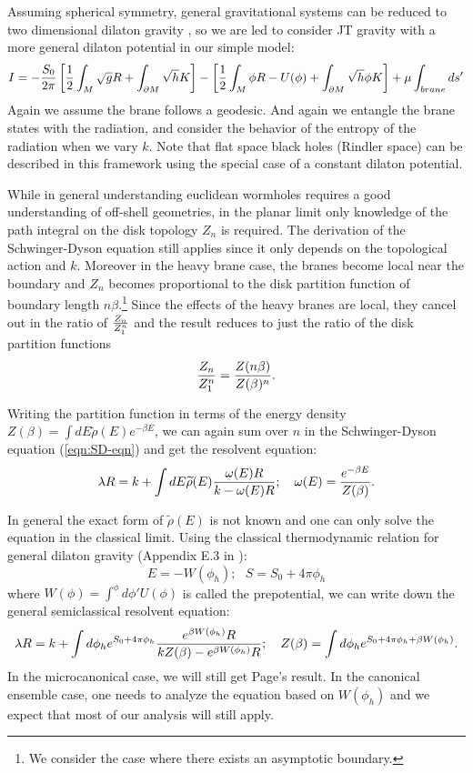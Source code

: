 \documentclass[11pt]{article}
\newcommand{\be}{\begin{equation}}
\newcommand{\ee}{\end{equation}}
\renewcommand{\tilde}{\widetilde}
\numberwithin{equation}{section}
\begin{document}
Assuming spherical symmetry, general gravitational systems can be reduced to  two dimensional dilaton gravity \cite{Strominger:1994tn}, so we are led to  consider  JT gravity with a more general dilaton potential in our simple model:
\be
I=-{S_0\over 2\pi}\left[{1\over 2}\int_{M}\sqrt{g}R+\int_{\partial M}\sqrt{h}K\right]-\left[{1\over 2}\int_M \phi R-U(\phi)+\int_{\partial M}\sqrt{h}\phi K\right ]+\mu \int_{brane}ds '
\ee
Again we assume the brane follows a geodesic.
And again we  entangle the brane states with the radiation,  and consider the behavior of the entropy of the radiation when we  vary $k$. Note that flat space black holes (Rindler space) can be described in this framework using the special case of a constant dilaton potential.


While in general understanding  euclidean wormholes requires a good understanding of  off-shell geometries, in the planar limit only knowledge of the path integral on the disk topology $Z_n$ is required.   The derivation of the Schwinger-Dyson equation still applies since it only depends on the topological action and $k$.  Moreover in the heavy brane case, the branes become local near the boundary and $Z_n$ becomes proportional to the disk partition function of boundary length $n\beta$.\footnote{We consider the case where there exists an asymptotic boundary.} Since the effects of the heavy branes are local, they cancel out in the ratio of ${Z_n\over Z_1^n}$ and the result reduces to just the ratio of the disk partition functions
\be
{Z_n\over Z_1^n}={Z(n\beta)\over Z(\beta)^n} .
\ee


Writing the partition function in terms of the energy density $Z(\beta)=\int dE \tilde \rho(E)e^{-\beta E}$, we can again sum over $n$ in the Schwinger-Dyson equation (\ref{eqn:SD-eqn}) and get the resolvent equation:
\be
\lambda R=k+\int dE \tilde \rho(E){\omega (E) R\over k-\omega(E) R};~~~\omega(E)={e^{-\beta E}\over Z(\beta)}.
\ee


In general the exact form of $\tilde\rho(E)$ is not known and one can only solve the equation in the classical limit.
Using the classical thermodynamic relation for general dilaton gravity (Appendix E.3 in \cite{Maldacena:2019cbz}):
\be
E=-W(\phi_h);~~~S=S_0+4\pi \phi_h
\ee
where $W(\phi)=\int^{\phi}d\phi' U(\phi)$ is called the prepotential, we can write down the general semiclassical resolvent equation:
\be\label{eqn: resolvent general dilaton gravity}
\lambda R=k+\int d\phi_h e^{S_0+4\pi \phi_h}{e^{\beta W(\phi_h)} R\over kZ(\beta)- e^{\beta W(\phi_h)}R};~~~Z(\beta)=\int d\phi_h e^{S_0+4\pi \phi_h+\beta W(\phi_h)}.
\ee
In the microcanonical  case, we will still get Page's result.
In the canonical ensemble case, one needs to analyze the equation based on $W(\phi_h)$ and we expect that most of our analysis will still apply.
\end{document}
